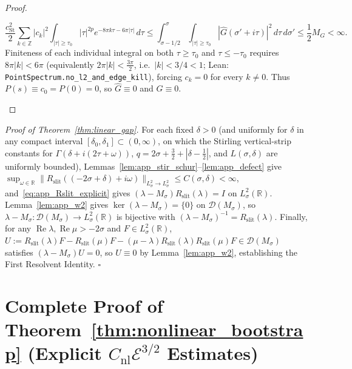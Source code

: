 \documentclass[11pt,a4paper]{article}
\begin{document}
\begin{proof}
\begin{enumerate}
  \[
  \frac{c_{\mathrm{St}}^2}{2}\sum_{k\in\mathbb{Z}}|c_k|^2\int_{|\tau|\ge\tau_0}|\tau|^{2p}e^{-8\pi k\tau-6\pi|\tau|}\,d\tau
  \le \int_{\sigma-1/2}^\sigma\int_{|\tau|\ge\tau_0}|\widehat{G}(\sigma'+i\tau)|^2\,d\tau\,d\sigma'
  \le \frac{1}{2}M_G < \infty.
  \]
  Finiteness of each individual integral on both $\tau\ge\tau_0$ and $\tau\le -\tau_0$ requires $8\pi|k|<6\pi$
  (equivalently $2\pi|k|<\frac{3\pi}{2}$, i.e.\ $|k|<3/4<1$; Lean: \texttt{PointSpectrum.no\_l2\_and\_edge\_kill}),
  forcing $c_k=0$ for every $k\ne 0$.
  Thus $P(s)\equiv c_0=P(0)=0$, so $\widehat{G}\equiv 0$ and $G\equiv 0$.
\end{enumerate}
\end{proof}

\noindent\textit{Proof of Theorem~\ref{thm:linear_gap}.}
For each fixed $\delta>0$ (and uniformly for $\delta$ in any compact interval $[\delta_0,\delta_1]\subset(0,\infty)$,
on which the Stirling vertical-strip constants for $\Gamma(\delta+i(2\tau+\omega))$, $q=2\sigma+\tfrac32+|\delta-\tfrac12|$,
and $L(\sigma,\delta)$ are uniformly bounded), Lemmas~\ref{lem:app_stir_schur}--\ref{lem:app_defect} give
$\sup_{\omega\in\mathbb{R}}\|R_{\mathrm{slit}}((-2\sigma+\delta)+i\omega)\|_{L^2_\sigma\to L^2_\sigma}\le C(\sigma,\delta)<\infty$,
and~\eqref{eq:app_Rslit_explicit} gives $(\lambda-M_\sigma)R_{\mathrm{slit}}(\lambda)=I$ on $L^2_\sigma(\mathbb{R})$.
Lemma~\ref{lem:app_w2} gives $\ker(\lambda-M_\sigma)=\{0\}$ on $\mathcal{D}(M_\sigma)$, so $\lambda-M_\sigma:\mathcal{D}(M_\sigma)\to L^2_\sigma(\mathbb{R})$
is bijective with $(\lambda-M_\sigma)^{-1}=R_{\mathrm{slit}}(\lambda)$.
Finally, for any $\operatorname{Re}\lambda,\operatorname{Re}\mu>-2\sigma$ and $F\in L^2_\sigma(\mathbb{R})$,
$U:=R_{\mathrm{slit}}(\lambda)F-R_{\mathrm{slit}}(\mu)F-(\mu-\lambda)R_{\mathrm{slit}}(\lambda)R_{\mathrm{slit}}(\mu)F\in\mathcal{D}(M_\sigma)$
satisfies $(\lambda-M_\sigma)U=0$, so $U\equiv 0$ by Lemma~\ref{lem:app_w2}, establishing the First Resolvent Identity. \hfill$\square$

\section{Complete Proof of Theorem~\ref{thm:nonlinear_bootstrap} (Explicit $C_{\mathrm{nl}}\mathcal{E}^{3/2}$ Estimates)}
\label{app:nonlin_est}
\end{document}

